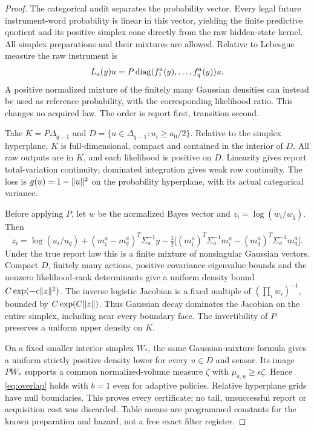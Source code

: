 \begin{proof}
The categorical audit separates the probability vector. Every legal future instrument-word probability is linear in this vector, yielding the finite predictive quotient and its positive simplex cone directly from the raw hidden-state kernel. All simplex preparations and their mixtures are allowed. Relative to Lebesgue measure the raw instrument is
\[
 L_a(y)u=P\operatorname{diag}(f_1^a(y),\ldots,f_q^a(y))u.
\]
A positive normalized mixture of the finitely many Gaussian densities can instead be used as reference probability, with the corresponding likelihood ratio. This changes no acquired law. The order is report first, transition second.

Take $K=P\Delta_{q-1}$ and $D=\{u\in\Delta_{q-1}:u_i\ge a_0/2\}$. Relative to the simplex hyperplane, $K$ is full-dimensional, compact and contained in the interior of $D$. All raw outputs are in $K$, and each likelihood is positive on $D$. Linearity gives report total-variation continuity; dominated integration gives weak row continuity. The loss is $g(u)=1-\lVert u\rVert^2$ on the probability hyperplane, with its actual categorical variance.

Before applying $P$, let $w$ be the normalized Bayes vector and $z_i=\log(w_i/w_q)$. Then
\[
 z_i=\log(u_i/u_q)+(m_i^a-m_q^a)^T\Sigma_a^{-1}y
 -\tfrac12\bigl[(m_i^a)^T\Sigma_a^{-1}m_i^a-(m_q^a)^T\Sigma_a^{-1}m_q^a\bigr].
\]
Under the true report law this is a finite mixture of nonsingular Gaussian vectors. Compact $D$, finitely many actions, positive covariance eigenvalue bounds and the nonzero likelihood-rank determinants give a uniform density bound $C\exp(-c\lVert z\rVert^2)$. The inverse logistic Jacobian is a fixed multiple of $(\prod_iw_i)^{-1}$, bounded by $C\exp(C\lVert z\rVert)$. Thus Gaussian decay dominates the Jacobian on the entire simplex, including near every boundary face. The invertibility of $P$ preserves a uniform upper density on $K$.

On a fixed smaller interior simplex $W_*$, the same Gaussian-mixture formula gives a uniform strictly positive density lower for every $u\in D$ and sensor. Its image $PW_*$ supports a common normalized-volume measure $\zeta$ with $\mu_{a,u}\ge\epsilon\zeta$. Hence \eqref{eq:overlap} holds with $b=1$ even for adaptive policies. Relative hyperplane grids have null boundaries. This proves every certificate; no tail, unsuccessful report or acquisition cost was discarded. Table means are programmed constants for the known preparation and hazard, not a free exact filter register.
\end{proof}

